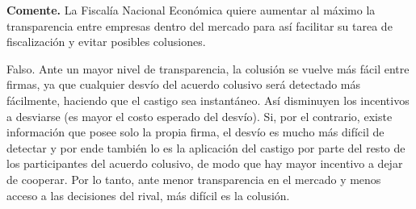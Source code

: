 \question \textbf{Comente.} La Fiscalía Nacional Económica quiere aumentar al máximo la transparencia entre empresas dentro del mercado para así facilitar su tarea de fiscalización y evitar posibles colusiones.
\begin{solution}
Falso. Ante un mayor nivel de transparencia, la colusión se vuelve más fácil entre firmas, ya que cualquier desvío del acuerdo colusivo será detectado más fácilmente, haciendo que el castigo sea instantáneo. Así disminuyen los incentivos a desviarse (es mayor el costo esperado del desvío). Si, por el contrario, existe información que posee solo la propia firma, el desvío es mucho más difícil de detectar y por ende también lo es la aplicación del castigo por parte del resto de los participantes del acuerdo colusivo, de modo que hay mayor incentivo a dejar de cooperar. Por lo tanto, ante menor transparencia en el mercado y menos acceso a las decisiones del rival, más difícil es la colusión.

\end{solution}

